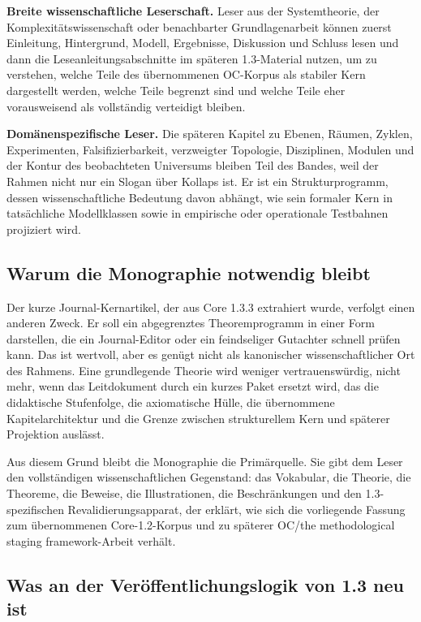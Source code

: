 \textbf{Breite wissenschaftliche Leserschaft.}
Leser aus der Systemtheorie, der Komplexitätswissenschaft oder benachbarter Grundlagenarbeit
können zuerst Einleitung, Hintergrund, Modell, Ergebnisse, Diskussion und Schluss lesen und dann
die Leseanleitungsabschnitte im späteren 1.3-Material nutzen, um zu verstehen, welche Teile des
übernommenen OC-Korpus als stabiler Kern dargestellt werden, welche Teile begrenzt sind und
welche Teile eher vorausweisend als vollständig verteidigt bleiben.

\textbf{Domänenspezifische Leser.}
Die späteren Kapitel zu Ebenen, Räumen, Zyklen, Experimenten, Falsifizierbarkeit, verzweigter
Topologie, Disziplinen, Modulen und der Kontur des beobachteten Universums bleiben Teil des
Bandes, weil der Rahmen nicht nur ein Slogan über Kollaps ist. Er ist ein Strukturprogramm,
dessen wissenschaftliche Bedeutung davon abhängt, wie sein formaler Kern in tatsächliche
Modellklassen sowie in empirische oder operationale Testbahnen projiziert wird.

\subsection{Warum die Monographie notwendig bleibt}

Der kurze Journal-Kernartikel, der aus Core 1.3.3 extrahiert wurde, verfolgt einen anderen Zweck.
Er soll ein abgegrenztes Theoremprogramm in einer Form darstellen, die ein Journal-Editor oder
ein feindseliger Gutachter schnell prüfen kann. Das ist wertvoll, aber es genügt nicht als
kanonischer wissenschaftlicher Ort des Rahmens. Eine grundlegende Theorie wird weniger
vertrauenswürdig, nicht mehr, wenn das Leitdokument durch ein kurzes Paket ersetzt wird, das die
didaktische Stufenfolge, die axiomatische Hülle, die übernommene Kapitelarchitektur und die
Grenze zwischen strukturellem Kern und späterer Projektion auslässt.

Aus diesem Grund bleibt die Monographie die Primärquelle. Sie gibt dem Leser den vollständigen
wissenschaftlichen Gegenstand: das Vokabular, die Theorie, die Theoreme, die Beweise, die
Illustrationen, die Beschränkungen und den 1.3-spezifischen Revalidierungsapparat, der erklärt,
wie sich die vorliegende Fassung zum übernommenen Core-1.2-Korpus und zu späterer OC/the methodological staging framework-Arbeit
verhält.

\subsection{Was an der Veröffentlichungslogik von 1.3 neu ist}

